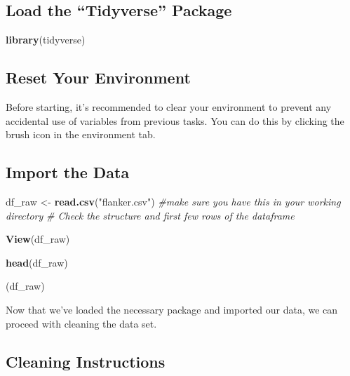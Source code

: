 \documentclass[
]{book}
\newenvironment{Shaded}{\begin{snugshade}}{\end{snugshade}}
\newcommand{\CommentTok}[1]{\textcolor[rgb]{0.56,0.35,0.01}{\textit{#1}}}
\newcommand{\FunctionTok}[1]{\textcolor[rgb]{0.13,0.29,0.53}{\textbf{#1}}}
\newcommand{\NormalTok}[1]{#1}
\newcommand{\OtherTok}[1]{\textcolor[rgb]{0.56,0.35,0.01}{#1}}
\newcommand{\StringTok}[1]{\textcolor[rgb]{0.31,0.60,0.02}{#1}}
\begin{document}
\subsection{\texorpdfstring{\textbf{Load the ``Tidyverse'' Package}}{Load the ``Tidyverse'' Package}}\label{load-the-tidyverse-package}

\begin{Shaded}
\begin{Highlighting}[]
\FunctionTok{library}\NormalTok{(tidyverse)}
\end{Highlighting}
\end{Shaded}

\subsection{\texorpdfstring{\textbf{Reset Your Environment}}{Reset Your Environment}}\label{reset-your-environment}

Before starting, it's recommended to clear your environment to prevent any accidental use of variables from previous tasks. You can do this by clicking the brush icon in the environment tab.

\subsection{\texorpdfstring{\textbf{Import the Data}}{Import the Data}}\label{import-the-data}

\begin{Shaded}
\begin{Highlighting}[]
\NormalTok{df\_raw }\OtherTok{\textless{}{-}} \FunctionTok{read.csv}\NormalTok{(}\StringTok{"flanker.csv"}\NormalTok{) }\CommentTok{\#make sure you have this in your working directory  }
\CommentTok{\# Check the structure and first few rows of the dataframe }

\FunctionTok{View}\NormalTok{(df\_raw) }

\FunctionTok{head}\NormalTok{(df\_raw)  }

\NormalTok{(df\_raw)}
\end{Highlighting}
\end{Shaded}

Now that we've loaded the necessary package and imported our data, we can proceed with cleaning the data set.

\subsection{Cleaning Instructions}\label{cleaning-instructions}
\end{document}

